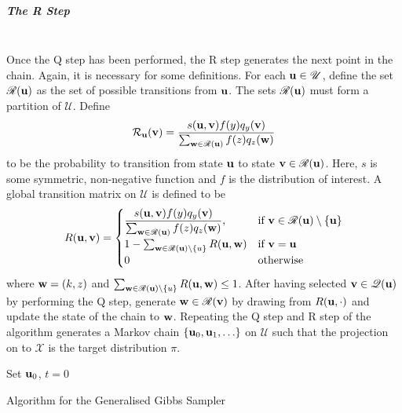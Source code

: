 \subparagraph{The R Step}~\\
\noindent
Once the Q step has been performed, the R step generates the next point in the chain. Again, it is necessary for some definitions.
For each $\mathbf{u} \in \mathscr U$, define the set $\mathscr R(\mathbf{u})$ as the set of possible transitions from $\mathbf{u}$. The sets $\mathscr R(\mathbf{u})$ must form a partition of ${\mathscr U}$. 
Define $$\mathcal R_{\mathbf{u}}(\mathbf{v}) = \frac{s(\mathbf{u},\mathbf{v})f(y)q_y(\mathbf{v})}{\sum_{\mathbf{w}\in\mathscr R(\mathbf{u})}f(z)q_z(\mathbf{w})}$$ to be the probability to transition from state $\mathbf{u}$ to state $\mathbf{v}\in\mathscr R(\mathbf{u})$. Here, $s$ is some symmetric, non-negative function and $f$ is the distribution of interest. %
A global transition matrix on ${\mathscr U}$ is defined to be
\begin{equation}
		R(\mathbf{u},\mathbf{v}) = 
			\begin{cases}
			\dfrac{s(\mathbf{u},\mathbf{v})f(y)q_y(\mathbf{v})}{\sum_{\mathbf{w}\in\mathscr R(\mathbf{u})}f(z)q_z(\mathbf{w})}, & \text{if } \mathbf{v} \in \mathscr R(\mathbf{u})\setminus\{\mathbf{u}\}\\
			1 - \sum_{\mathbf{w} \in \mathscr R(\mathbf{u})\setminus\mathbf{\{}u\}} R(\mathbf{u},\mathbf{w}) & 
		    \text{if $\mathbf{v} = \mathbf{u}$}\\
			0 & \text{otherwise}\end{cases}
		\end{equation}
	where $\mathbf{w} = (k,z)$ and $\sum_{\mathbf{w} \in \mathscr R(\mathbf{u})\setminus\mathbf{\{}u\}} R(\mathbf{u},\mathbf{w}) \leq 1$.
After having selected $\mathbf{v} \in \mathscr Q(\mathbf{u})$ by performing the Q step, generate $\mathbf{w} \in \mathscr R(\mathbf{v})$ by drawing from $R(\mathbf{u},\cdot)$ and update the state of the chain to $\mathbf{w}$.
Repeating the Q step and R step of the algorithm generates a Markov chain $\{\mathbf{u}_0,\mathbf{u}_1,\ldots\}$ on $\mathscr U$ such that the projection on to $\mathscr X$ is the target distribution $\pi$.

\begin{algorithm}[H]
 Set $\mathbf{u}_0$, $t=0$\; 
  \caption{Algorithm for the Generalised Gibbs Sampler}
\end{algorithm}